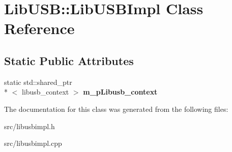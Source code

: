 \hypertarget{class_lib_u_s_b_1_1_lib_u_s_b_impl}{\section{Lib\-U\-S\-B\-:\-:Lib\-U\-S\-B\-Impl Class Reference}
\label{class_lib_u_s_b_1_1_lib_u_s_b_impl}
}
\subsection*{Static Public Attributes}
\begin{DoxyCompactItemize}
\item 
\hypertarget{class_lib_u_s_b_1_1_lib_u_s_b_impl_a7a46d2540e0e2ea68f47920748a487af}{static std\-::shared\-\_\-ptr\\*
$<$ libusb\-\_\-context $>$ {\bfseries m\-\_\-p\-Libusb\-\_\-context}}\label{class_lib_u_s_b_1_1_lib_u_s_b_impl_a7a46d2540e0e2ea68f47920748a487af}

\end{DoxyCompactItemize}


The documentation for this class was generated from the following files\-:\begin{DoxyCompactItemize}
\item 
src/libusbimpl.\-h\item 
src/libusbimpl.\-cpp\end{DoxyCompactItemize}
